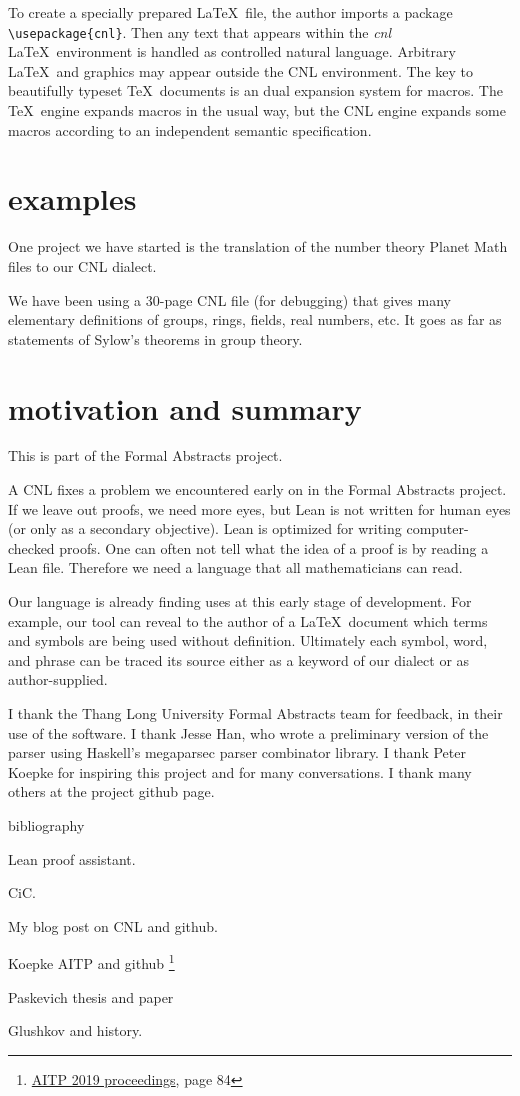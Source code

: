 \documentclass[12pt]{amsart}
\renewcommand{\~}{\ }
\renewcommand{\_}{\textunderscore}
\begin{document}
To create a specially prepared \LaTeX\ file, the author imports a
package \verb!\usepackage{cnl}!. Then any text that appears within the
\emph{cnl} \LaTeX\ environment is handled as controlled natural
language.  Arbitrary \LaTeX\ and graphics may appear outside the CNL
environment.  The key to beautifully typeset \TeX\ documents is an
dual expansion system for macros.  The \TeX\ engine expands macros in
the usual way, but the CNL engine expands some macros according to an
independent semantic specification.

\section{examples}

One project we have started is the translation of the number theory
Planet Math files to our CNL dialect.

We have been using a 30-page CNL file (for debugging) that 
gives many elementary definitions of groups, rings, fields, real numbers, etc.
It goes as far as statements of Sylow's theorems in group theory.


\section{motivation and summary}

This is part of the Formal Abstracts project.

A CNL fixes a problem we encountered early on in the Formal Abstracts
project.   If we leave out proofs, we need more eyes, but Lean
is not written for human eyes (or only as a secondary objective).  
Lean is optimized for writing 
computer-checked proofs.  
One can often not tell what the idea of a proof is by reading a Lean file.
Therefore we need a language that all mathematicians can read.

Our language is already finding uses at this early stage of
development.  For example, our tool can reveal to the author of a
\LaTeX\ document which terms and symbols are being used without
definition.  Ultimately each symbol, word, and phrase can be traced
its source either as a keyword of our dialect or as author-supplied.

I thank the Thang Long University Formal Abstracts team for feedback,
in their use of the software.  I thank Jesse Han, who wrote a
preliminary version of the parser using Haskell's megaparsec parser
combinator library.  I thank Peter Koepke for inspiring this project
and for many conversations.  I thank many others at the project github page.

bibliography

Lean proof assistant.

CiC.

My blog post on CNL and github.

Koepke AITP and github
\footnote{\href{http://aitp-conference.org/2019/aitp19-proceedings.pdf}{AITP
    2019 proceedings}, page 84}

Paskevich thesis and paper

Glushkov and history.
\end{document}
